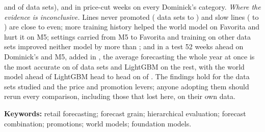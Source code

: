 \kWmWorseFast{} and \kWmWorseLongHistory{} of \rqNineWord{} data sets), and in price-cut weeks on
every Dominick's category.
\emph{Where the evidence is inconclusive.} Lines never promoted (\kWmBetterNoPromotion{} data
sets to \kWmWorseNoPromotion{}) and slow lines (\kWmBetterSlow{} to \kWmWorseSlow{}) are close to
even; more training history helped the world model on Favorita and hurt it on M5; settings
carried from M5 to Favorita and training on other data sets improved neither model by more than
\rqPoolGainMax{}; and in a test 52 weeks ahead on Dominick's and M5, added in \thisrev{}, the
average forecasting the whole year at once is the most accurate on \lhLowestAvgDirect{} of
\lhSets{} data sets and LightGBM on the rest, with the world model ahead of LightGBM head to head on
\lhWmDirAheadN{} of \lhWmDirSets{}. The findings hold for the data sets studied and the price and
promotion levers; anyone adopting them should rerun every comparison, including those that lost
here, on their own data.

\vspace{4pt}
\textbf{Keywords:} retail forecasting; forecast grain; hierarchical evaluation;
forecast combination; promotions; world models; foundation models.

